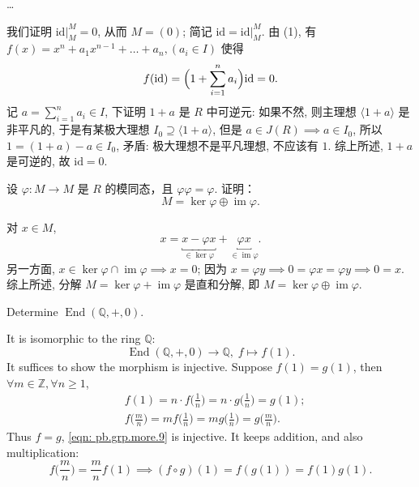 \begin{solution}
    \dots
    \par 我们证明 $\left.{\mathrm{id}}\right|_{M}^{M}=0$, 从而 $M=(0)$; 简记 $\mathrm{id}=\left.{\mathrm{id}}\right|_{M}^{M}$. 由 (1), 有 $f(x) = x^n + a_1 x^{n-1} + \dots + a_n,(a_{i}\in I)$ 使得  
        \[
            f(\mathrm{id})=\Bigl(1+\sum_{i=1}^{n}a_{i}\Bigr)\mathrm{id}=0.
        \]
    记 $a=\sum_{i=1}^{n}a_{i}\in I$, 下证明 $1+a$ 是 $R$ 中可逆元: 如果不然, 则主理想 $ \langle 1+a \rangle  $ 是非平凡的, 
    于是有某极大理想 $I_{0}\supseteq \langle 1+a \rangle$, 但是 $a\in J(R)\implies a\in I_{0}$, 所以 $1=(1+a)-a\in I_{0}$, 
    矛盾: 极大理想不是平凡理想, 不应该有 $1$. 综上所述, $1+a$ 是可逆的, 故 $\mathrm{id}=0$.
\end{solution}

\setcounter{pb}{6}
\begin{problem}
    设 $ \varphi: M \to M $ 是 $ R $ 的模同态，且 $ \varphi \varphi = \varphi $. 
    证明：
    \[
        M = \ker \varphi \oplus \operatorname{im} \varphi.
    \]
\end{problem}

\begin{solution}
    对 $x\in M$, 
        \[
            x=\underbracket{x-\varphi x}_{\in\ker \varphi}+\underbracket{\varphi x}_{\in \operatorname{im}\varphi}.
        \]
    另一方面, $x\in\ker\varphi\cap \operatorname{im}\varphi\implies x=0$; 因为 $x=\varphi y\implies 0=\varphi x=\varphi y\implies 0=x$. 
    综上所述, 分解 $M=\ker\varphi+\operatorname{im}\varphi$ 是直和分解, 即 $M=\ker\varphi\oplus\operatorname{im}\varphi$. 
\end{solution}
    
\setcounter{pb}{10}
\begin{problem}
    Determine $\operatorname{End}(\mathbb{Q},+,0)$.
\end{problem}

\begin{solution}
    It is isomorphic to the ring $\mathbb{Q}$:
        \begin{equation}
            \label{eqn: pb.grp.more.9}
            \operatorname{End}(\mathbb{Q},+,0) \to \mathbb{Q},\; f\mapsto f(1). 
        \end{equation}
    It suffices to show the morphism is injective.  Suppose $f(1)=g(1)$, then $\forall m\in\mathbb{Z},\forall n\geq1  $, 
        \[
            \begin{split}
                & f(1)=n\cdot f\Big(\frac{1}{n}\Big)=n\cdot g\Big(\frac{1}{n}\Big)=g(1);\\
                & f\Big(\frac{m}{n}\Big)=m f\Big(\frac{1}{n}\Big)=m g\Big(\frac{1}{n}\Big)=g\Big(\frac{m}{n}\Big).
            \end{split}
        \]
    Thus $f=g$, \eqref{eqn: pb.grp.more.9} is injective. 
    It keeps addition, and also multiplication:
        \[
            f\Big(\frac{m}{n}\Big)=\frac{m}{n}f(1)\implies(f\circ g)(1)=f( g(1) )=f(1) g(1).
        \]
\end{solution}

